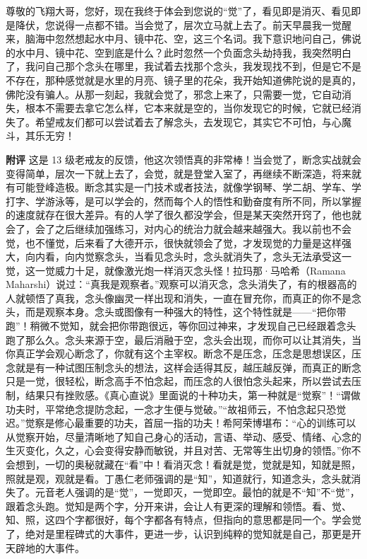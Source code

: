 \begin{case}
    尊敬的飞翔大哥，您好，现在我终于体会到您说的“觉”了，看见即是消灭、看见即是降伏，您说得一点都不错。当会觉了，层次立马就上去了。前天早晨我一觉醒来，脑海中忽然想起水中月、镜中花、空，这三个名词。我下意识地问自己，佛说的水中月、镜中花、空到底是什么？此时忽然一个负面念头劫持我，我突然明白了，我问自己那个念头在哪里，我试着去找那个念头，我发现找不到，但是它不是不存在，那种感觉就是水里的月亮、镜子里的花朵，我开始知道佛陀说的是真的，佛陀没有骗人。从那一刻起，我就会觉了，邪念上来了，只需要一觉，它自动消失，根本不需要去拿它怎么样，它本来就是空的，当你发现它的时候，它就已经消失了。希望戒友们都可以尝试着去了解念头，去发现它，其实它不可怕，与心魔斗，其乐无穷！

    \textbf{附评} 这是 13 级老戒友的反馈，他这次领悟真的非常棒！当会觉了，断念实战就会变得简单，层次一下就上去了，会觉，就是登堂入室了，再继续不断深造，将来就有可能登峰造极。断念其实是一门技术或者技法，就像学钢琴、学二胡、学车、学打字、学游泳等，是可以学会的，然而每个人的悟性和勤奋度有所不同，所以掌握的速度就存在很大差异。有的人学了很久都没学会，但是某天突然开窍了，他也就会了，会了之后继续加强练习，对内心的统治力就会越来越强大。我以前也不会觉，也不懂觉，后来看了大德开示，很快就领会了觉，才发现觉的力量是这样强大，向内看，向内觉察念头，当看见念头时，念头就消失了，念头无法承受这一觉，这一觉威力十足，就像激光炮一样消灭念头怪！拉玛那·马哈希（Ramana Maharshi）说过：“真我是观察者。”观察可以消灭念，念头消失了，有的根器高的人就顿悟了真我，念头像幽灵一样出现和消失，一直在冒充你，而真正的你不是念头，而是观察本身。念头或图像有一种强大的特性，这个特性就是——“把你带跑”！稍微不觉知，就会把你带跑很远，等你回过神来，才发现自己已经跟着念头跑了那么久。念头来源于空，最后消融于空，念头会出现，而你可以让其消失，当你真正学会观心断念了，你就有这个主宰权。断念不是压念，压念是思想误区，压念就是有一种试图压制念头的想法，这样会适得其反，越压越反弹，而真正的断念只是一觉，很轻松，断念高手不怕念起，而压念的人很怕念头起来，所以尝试去压制，结果只有挫败感。《真心直说》里面说的十种功夫，第一种就是“觉察”！“谓做功夫时，平常绝念提防念起，一念才生便与觉破。”“故祖师云，不怕念起只恐觉迟。”觉察是修心最重要的功夫，首屈一指的功夫！希阿荣博堪布：“心的训练可以从觉察开始，尽量清晰地了知自己身心的活动，言语、举动、感受、情绪、心念的生灭变化，久之，心会变得安静而敏锐，并且对苦、无常等生出切身的领悟。”你不会想到，一切的奥秘就藏在“看”中！看消灭念！看就是觉，觉就是知，知就是照，照就是观，观就是看。丁愚仁老师强调的是“知”，知道就行，知道念头，念头就消失了。元音老人强调的是“觉”，一觉即灭，一觉即空。最怕的就是不“知”不“觉”，跟着念头跑。觉知是两个字，分开来讲，会让人有更深的理解和领悟。看、觉、知、照，这四个字都很好，每个字都各有特点，但指向的意思都是同一个。学会觉了，绝对是里程碑式的大事件，更进一步，认识到纯粹的觉知就是自己，那更是开天辟地的大事件。
\end{case}

